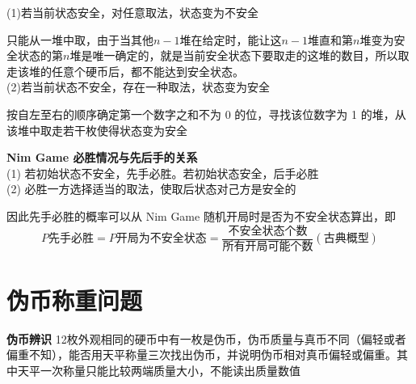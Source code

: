 \documentclass[10t, a4paper, oneside]{ctexbook}
\begin{document}
\noindent(1)若当前状态安全，对任意取法，状态变为不安全

    只能从一堆中取，由于当其他$n-1$堆在给定时，能让这$n-1$堆直和第$n$堆变为安全状态的第$n$堆是唯一确定的，就是当前安全状态下要取走的这堆的数目，所以取走该堆的任意个硬币后，都不能达到安全状态。\\
(2)若当前状态不安全，存在一种取法，状态变为安全

    按自左至右的顺序确定第一个数字之和不为 0 的位，寻找该位数字为 1 的堆，从该堆中取走若干枚使得状态变为安全

\noindent\textbf{Nim Game 必胜情况与先后手的关系}\\
(1) 若初始状态不安全，先手必胜。若初始状态安全，后手必胜\\
(2) 必胜一方选择适当的取法，使取后状态对己方是安全的

因此先手必胜的概率可以从 Nim Game 随机开局时是否为不安全状态算出，即
$$P{\text{先手必胜}} = P{\text{开局为不安全状态}} = \frac{\text{不安全状态个数}}{\text{所有开局可能个数}}(\text{古典概型})$$

\section{伪币称重问题}
\noindent\textbf{伪币辨识}
12枚外观相同的硬币中有一枚是伪币，伪币质量与真币不同（偏轻或者偏重不知），能否用天平称量三次找出伪币，并说明伪币相对真币偏轻或偏重。其中天平一次称量只能比较两端质量大小，不能读出质量数值
\end{document}
